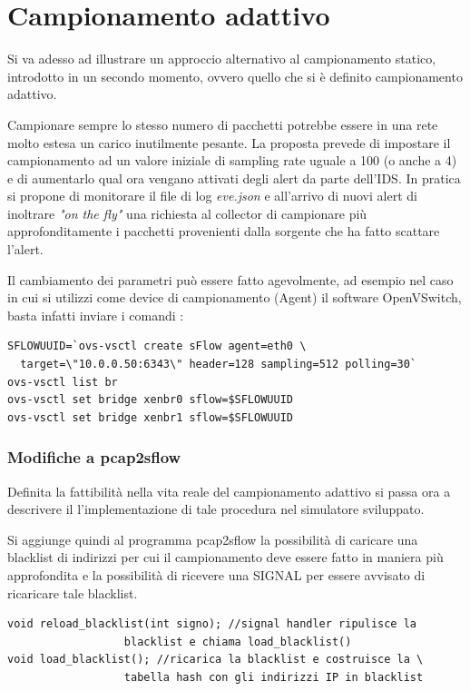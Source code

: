 \documentclass[12pt,a4paper,openright,twoside]{report}
\begin{document}
\section{Campionamento adattivo}

Si va adesso ad illustrare un approccio alternativo al campionamento statico, introdotto
in un secondo momento, ovvero quello che si \`e definito campionamento adattivo.

Campionare sempre lo stesso numero di pacchetti potrebbe essere in una rete molto estesa
un carico inutilmente pesante. La proposta prevede di impostare il campionamento ad un
valore iniziale di sampling rate uguale a 100 (o anche a 4) e di aumentarlo qual ora vengano attivati
degli alert da parte dell'IDS.
In pratica si propone di monitorare il file di log {\it eve.json} e all'arrivo di nuovi alert
di inoltrare {\it "on the fly"}
una richiesta al collector di campionare pi\`u approfonditamente i pacchetti provenienti dalla
sorgente che ha fatto scattare l'alert.

Il cambiamento dei parametri pu\`o essere fatto agevolmente, ad esempio nel caso in cui si
utilizzi come device di campionamento (Agent) il software OpenVSwitch, basta infatti
inviare i comandi :
\begin{verbatim}
SFLOWUUID=`ovs-vsctl create sFlow agent=eth0 \
  target=\"10.0.0.50:6343\" header=128 sampling=512 polling=30`
ovs-vsctl list br
ovs-vsctl set bridge xenbr0 sflow=$SFLOWUUID
ovs-vsctl set bridge xenbr1 sflow=$SFLOWUUID
\end{verbatim}

\subsubsection{Modifiche a pcap2sflow}


Definita la fattibilit\`a nella vita reale del campionamento adattivo si passa ora a descrivere
il l'implementazione di tale procedura nel simulatore sviluppato.

Si aggiunge quindi al programma pcap2sflow la possibilit\`a di caricare una blacklist di indirizzi
per cui il campionamento deve essere fatto in maniera pi\`u approfondita e la
possibilit\`a di ricevere una SIGNAL per essere avvisato di ricaricare tale blacklist.

\begin{verbatim}
void reload_blacklist(int signo); //signal handler ripulisce la
                  blacklist e chiama load_blacklist()
void load_blacklist(); //ricarica la blacklist e costruisce la \
                  tabella hash con gli indirizzi IP in blacklist
\end{verbatim}
\end{document}
